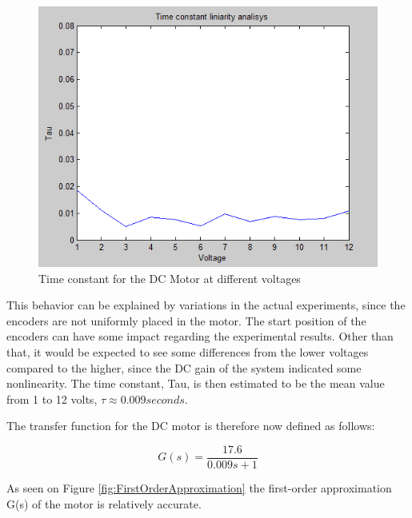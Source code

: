 \begin{figure}[h!]
\centering
\includegraphics[scale=0.5]{Billeder/TimeConstantLinearityAnalysis.png}
\caption{Time constant for the DC Motor at different voltages}
\label{fig:TimeConstantLinearityAnalysis}
\end{figure}

This behavior can be explained by variations in the actual experiments, since the encoders are not uniformly placed in the motor. The start position of the encoders can have some impact regarding the experimental results. Other than that, it would be expected to see some differences from the lower voltages compared to the higher, since the DC gain of the system indicated some nonlinearity. The time constant, Tau, is then estimated to be the mean value from 1 to 12 volts, $\tau\approx0.009 seconds$.

The transfer function for the DC motor is therefore now defined as follows:

\begin{equation}
G(s)=\frac{17.6}{0.009s+1}
\end{equation}

As seen on Figure \ref{fig:FirstOrderApproximation} the first-order approximation G(s) of the motor is relatively accurate.

